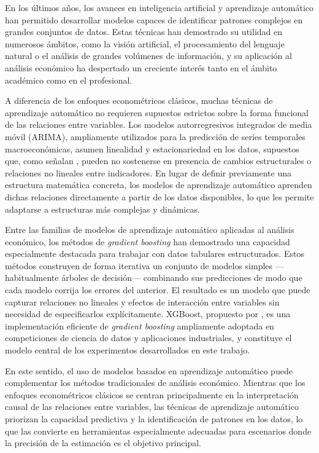 En los últimos años, los avances en inteligencia artificial y aprendizaje automático han permitido desarrollar modelos capaces de identificar patrones complejos en grandes conjuntos de datos. Estas técnicas han demostrado su utilidad en numerosos ámbitos, como la visión artificial, el procesamiento del lenguaje natural o el análisis de grandes volúmenes de información, y su aplicación al análisis económico ha despertado un creciente interés tanto en el ámbito académico como en el profesional. \citet{mullainathan_spiess_2017}

A diferencia de los enfoques econométricos clásicos, muchas técnicas de aprendizaje automático no requieren supuestos estrictos sobre la forma funcional de las relaciones entre variables. Los modelos autorregresivos integrados de media móvil (ARIMA), ampliamente utilizados para la predicción de series temporales macroeconómicas, asumen linealidad y estacionariedad en los datos, supuestos que, como señalan \citet{stellwagen_tashman_2013}, pueden no sostenerse en presencia de cambios estructurales o relaciones no lineales entre indicadores. En lugar de definir previamente una estructura matemática concreta, los modelos de aprendizaje automático aprenden dichas relaciones directamente a partir de los datos disponibles, lo que les permite adaptarse a estructuras más complejas y dinámicas.

Entre las familias de modelos de aprendizaje automático aplicadas al análisis económico, los métodos de \textit{gradient boosting} han demostrado una capacidad especialmente destacada para trabajar con datos tabulares estructurados. \citet{friedman_gradient_boosting_2001} Estos métodos construyen de forma iterativa un conjunto de modelos simples ---habitualmente árboles de decisión--- combinando sus predicciones de modo que cada modelo corrija los errores del anterior. El resultado es un modelo que puede capturar relaciones no lineales y efectos de interacción entre variables sin necesidad de especificarlos explícitamente. XGBoost, propuesto por \citet{chen_guestrin_2016}, es una implementación eficiente de \textit{gradient boosting} ampliamente adoptada en competiciones de ciencia de datos y aplicaciones industriales, y constituye el modelo central de los experimentos desarrollados en este trabajo.

En este sentido, el uso de modelos basados en aprendizaje automático puede complementar los métodos tradicionales de análisis económico. Mientras que los enfoques econométricos clásicos se centran principalmente en la interpretación causal de las relaciones entre variables, las técnicas de aprendizaje automático priorizan la capacidad predictiva y la identificación de patrones en los datos, lo que las convierte en herramientas especialmente adecuadas para escenarios donde la precisión de la estimación es el objetivo principal.

